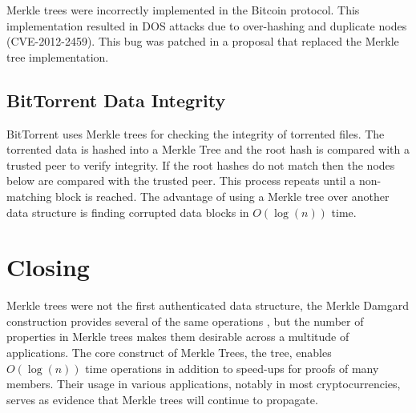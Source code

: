 \documentclass[12pt]{article}
\begin{document}
Merkle trees were incorrectly implemented in the Bitcoin protocol. This implementation resulted in DOS attacks due to over-hashing and duplicate nodes (CVE-2012-2459). This bug was patched in a proposal that replaced the Merkle tree implementation\cite{friedenbach_alm_2017}.


\subsection{BitTorrent Data Integrity} \label{sec:BitTorrent}

BitTorrent uses Merkle trees for checking the integrity of torrented files. The torrented data is hashed into a Merkle Tree and the root hash is compared with a trusted peer to verify integrity\cite{bep30}. If the root hashes do not match then the nodes below are compared with the trusted peer. This process repeats until a non-matching block is reached. The advantage of using a Merkle tree over another data structure is finding corrupted data blocks in $O(\log(n))$ time. 

\section{Closing}

Merkle trees were not the first authenticated data structure, the Merkle Damgard construction provides several of the same operations \cite{boneh2020graduate}, but the number of properties in Merkle trees makes them desirable across a multitude of applications. The core construct of Merkle Trees, the tree, enables $O(\log (n))$  time operations in addition to speed-ups for proofs of many members. Their usage in various applications, notably in most cryptocurrencies, serves as evidence that Merkle trees will continue to propagate. 



\newpage

\printbibliography
\end{document}
